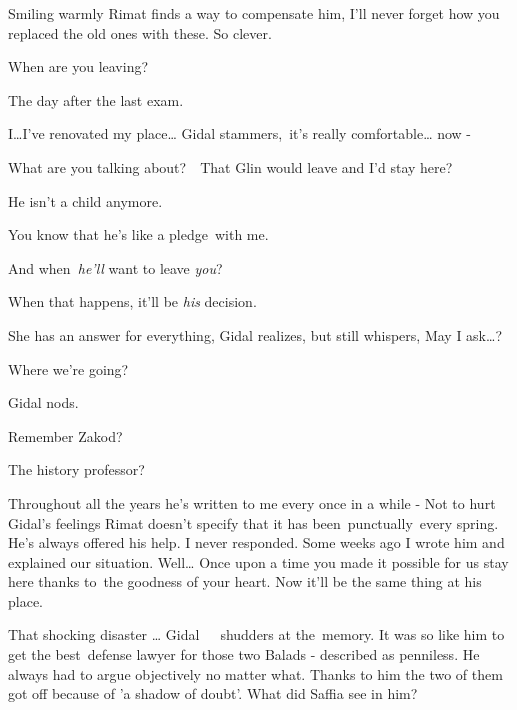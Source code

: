 \documentclass[twoside,11pt]{book}
\begin{document}
Smiling warmly Rimat finds a way to compensate him, {\textquotedbl}I'll never forget how you replaced the old ones with
these. So clever.{\textquotedbl} 

{\textquotedbl}When are you leaving?{\textquotedbl} 

{\textquotedbl}The day after the last exam.{\textquotedbl} 

{\textquotedbl}I{\dots}I've renovated my place{\dots}{\textquotedbl} Gidal stammers,~{\textquotedbl}it's really
comfortable{\dots} now - {\textquotedbl} 

{\textquotedbl}What are you talking about?\ \ That Glin would leave and I'd stay here?{\textquotedbl} 

{\textquotedbl}He isn't a child anymore.{\textquotedbl} 

{\textquotedbl}You know that he's like a pledge{\ }with me.{\textquotedbl} 

{\textquotedbl}And when\textit{\ he'll} want to leave \textit{you}?{\textquotedbl} 

{\textquotedbl}When that happens, it'll be \textit{his} decision.{\textquotedbl} 

She has an answer for everything, Gidal realizes, but still whispers, {\textquotedbl}May I ask{\dots}?{\textquotedbl} 

{\textquotedbl}Where we're going?{\textquotedbl} 

Gidal nods. 

{\textquotedbl}Remember Zakod?{\textquotedbl} 

{\textquotedbl}The history professor?{\textquotedbl} 

{\textquotedbl}Throughout all the years he's written to me every once in a while -{\textquotedbl} Not to hurt Gidal's
feelings Rimat doesn't specify that it has been{\ }{punctually}{\ }every
spring. {\textquotedbl}He's always offered his help. I never responded. Some weeks ago I wrote him and explained our
situation. Well{\dots} Once upon a time you made it possible for us stay here thanks to{\ }the goodness
of your heart. Now it'll be the same thing at his place.{\textquotedbl} 

{\textquotedbl}That shocking disaster {\dots}{\textquotedbl} Gidal{\ \ \ }shudders at
the{\ }memory. {\textquotedbl}It was so like him to get the best~defense lawyer for those two Balads -
described as penniless. He always had to argue objectively no matter what. Thanks to him the two of them got off
because of 'a shadow of doubt'. What did Saffia see in him?{\textquotedbl} 
\end{document}
